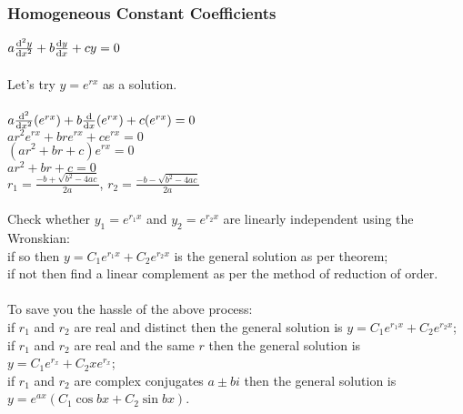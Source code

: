 \documentclass{article}
\begin{document}
			\subsubsection{Homogeneous Constant Coefficients}
				$a\dv[2]{y}{x} + b\dv{y}{x} + cy = 0$ \\
				\\
				Let's try $y = e^{rx}$ as a solution. \\
				\\
				$a\dv[2]{x}(e^{rx}) + b\dv{x}(e^{rx}) + c(e^{rx}) = 0$ \\
				$ar^{2}e^{rx} + bre^{rx} + ce^{rx} = 0$ \\
				$(ar^{2} + br + c)e^{rx} = 0$ \\
				$ar^{2} + br + c = 0$ \\
				$r_1 = \frac{-b + \sqrt{b^{2} - 4ac}}{2a}$, $r_2 = \frac{-b - \sqrt{b^{2} - 4ac}}{2a}$ \\
				\\
				Check whether $y_1 = e^{r_{1}x}$ and $y_2 = e^{r_{2}x}$ are linearly independent using the Wronskian: \\
				\textbullet \; if so then $y = C_{1}e^{r_{1}x} + C_{2}e^{r_{2}x}$ is the general solution as per theorem; \\
				\textbullet \; if not then find a linear complement as per the method of reduction of order. \\
				\\
				To save you the hassle of the above process: \\
				\textbullet \; if $r_1$ and $r_2$ are real and distinct then the general solution is $y = C_{1}e^{r_{1}x} + C_{2}e^{r_{2}x}$; \\
				\textbullet \; if $r_1$ and $r_2$ are real and the same $r$ then the general solution is $y = C_{1}e^{r_x} + C_{2}xe^{r_x}$; \\
				\textbullet \; if $r_1$ and $r_2$ are complex conjugates $a \pm bi$ then the general solution is $y = e^{ax}(C_{1}\cos{bx} + C_{2}\sin{bx})$. \\
			
\end{document}
